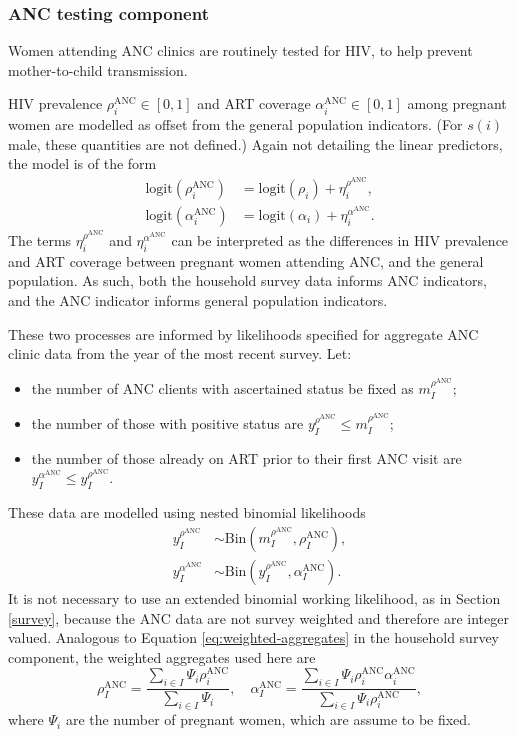 \documentclass[a4paper, nobind]{templates/ociamthesis}
\providecommand{\tightlist}{%
  \setlength{\itemsep}{0pt}\setlength{\parskip}{0pt}}
\begin{document}
\hypertarget{anc}{%
\subsubsection{ANC testing component}\label{anc}}

Women attending ANC clinics are routinely tested for HIV, to help prevent mother-to-child transmission.

HIV prevalence \(\rho^\text{ANC}_i \in [0, 1]\) and ART coverage \(\alpha^\text{ANC}_i \in [0, 1]\) among pregnant women are modelled as offset from the general population indicators.
(For \(s(i)\) male, these quantities are not defined.)
Again not detailing the linear predictors, the model is of the form
\begin{align}
\text{logit}(\rho^\text{ANC}_i) &= \text{logit}(\rho_i) + \eta^{\rho^\text{ANC}}_i, \\
\text{logit}(\alpha^\text{ANC}_i) &= \text{logit}(\alpha_i) + \eta^{\alpha^\text{ANC}}_i.
\end{align}
The terms \(\eta^{\rho^\text{ANC}}_i\) and \(\eta^{\alpha^\text{ANC}}_i\) can be interpreted as the differences in HIV prevalence and ART coverage between pregnant women attending ANC, and the general population.
As such, both the household survey data informs ANC indicators, and the ANC indicator informs general population indicators.

These two processes are informed by likelihoods specified for aggregate ANC clinic data from the year of the most recent survey.
Let:

\begin{itemize}
\tightlist
\item
  the number of ANC clients with ascertained status be fixed as \(m^{\rho^\text{ANC}}_I\);
\item
  the number of those with positive status are \(y^{\rho^\text{ANC}}_I \leq m^{\rho^\text{ANC}}_I\);
\item
  the number of those already on ART prior to their first ANC visit are \(y^{\alpha^\text{ANC}}_I \leq y^{\rho^\text{ANC}}_I\).
\end{itemize}

These data are modelled using nested binomial likelihoods
\begin{align*}
y^{\rho^\text{ANC}}_I &\sim \text{Bin}(m^{\rho^\text{ANC}}_I, \rho^\text{ANC}_{I}), \\
y^{\alpha^\text{ANC}}_I &\sim \text{Bin}(y^{\rho^\text{ANC}}_I, \alpha^\text{ANC}_{I}).
\end{align*}
It is not necessary to use an extended binomial working likelihood, as in Section \ref{survey}, because the ANC data are not survey weighted and therefore are integer valued.
Analogous to Equation \eqref{eq:weighted-aggregates} in the household survey component, the weighted aggregates used here are
\begin{equation*}
\rho^\text{ANC}_{I} = \frac{\sum_{i \in I} \Psi_i \rho_i^\text{ANC}}{\sum_{i \in I} \Psi_i}, \quad
\alpha^\text{ANC}_{I} = \frac{\sum_{i \in I} \Psi_i \rho_i^\text{ANC} \alpha^\text{ANC}_i}{\sum_{i \in I} \Psi_i \rho_i^\text{ANC}},
\end{equation*}
where \(\Psi_i\) are the number of pregnant women, which are assume to be fixed.
\end{document}
